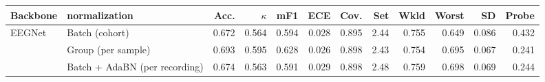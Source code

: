 \begin{tabular}{llrrrrrrrrrr}
\toprule
Backbone & normalization & \textbf{Acc.} & \textbf{$\kappa$} & \textbf{mF1} & \textbf{ECE} & \textbf{Cov.} & \textbf{Set} & \textbf{Wkld} & \textbf{Worst} & \textbf{SD} & \textbf{Probe} \\
\midrule
\multirow{3}{*}{EEGNet} & Batch (cohort) & 0.672 & 0.564 & 0.594 & 0.028 & 0.895 & 2.44 & 0.755 & 0.649 & 0.086 & 0.432 \\
 & Group (per sample) & 0.693 & 0.595 & 0.628 & 0.026 & 0.898 & 2.43 & 0.754 & 0.695 & 0.067 & 0.241 \\
 & Batch + AdaBN (per recording) & 0.674 & 0.563 & 0.591 & 0.029 & 0.898 & 2.48 & 0.759 & 0.698 & 0.069 & 0.244 \\
\bottomrule
\end{tabular}